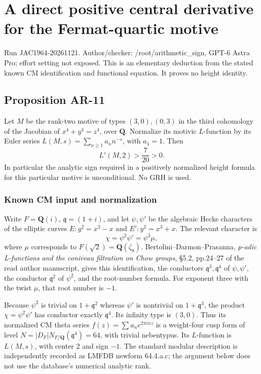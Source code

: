 \section{A direct positive central derivative for the Fermat-quartic
motive}\label{a-direct-positive-central-derivative-for-the-fermat-quartic-motive}

Run JAC1964-20261121. Author/checker: /root/arithmetic\_sign, GPT-6
Astra Pro; effort setting not exposed. This is an elementary deduction
from the stated known CM identification and functional equation. It
proves no height identity.

\subsection{Proposition AR-11}\label{proposition-ar-11}

Let \(M\) be the rank-two motive of types \((3,0),(0,3)\) in the third
cohomology of the Jacobian of \(x^4+y^4=z^4\), over \(\mathbf Q\).
Normalize its motivic \(L\)-function by its Euler series
\(L(M,s)=\sum_{n\ge1}a_n n^{-s}\), with \(a_1=1\). Then \[
L'(M,2)>\frac7{20}>0.
\tag{AR.14}
\] In particular the analytic sign required in a positively normalized
height formula for this particular motive is unconditional. No GRH is
used.

\subsubsection{Known CM input and
normalization}\label{known-cm-input-and-normalization}

Write \(F=\mathbf Q(i)\), \(\mathfrak q=(1+i)\), and let \(\psi,\psi'\)
be the algebraic Hecke characters of the elliptic curves \(E:y^2=x^3-x\)
and \(E':y^2=x^3+x\). The relevant character is \[
\chi=\psi^2\psi'=\psi^3\mu,
\] where \(\mu\) corresponds to \(F(\sqrt2)=\mathbf Q(\zeta_8)\).
Bertolini--Darmon--Prasanna, \emph{p-adic L-functions and the coniveau
filtration on Chow groups}, §5.2, pp.24--27 of the read author
manuscript, gives this identification, the conductors
\(\mathfrak q^3,\mathfrak q^4\) of \(\psi,\psi'\), the conductor
\(\mathfrak q^2\) of \(\psi^2\), and the root-number formula. For
exponent three with the twist \(\mu\), that root number is \(-1\).

Because \(\psi^2\) is trivial on \(1+\mathfrak q^2\) whereas \(\psi'\)
is nontrivial on \(1+\mathfrak q^3\), the product \(\chi=\psi^2\psi'\)
has conductor exactly \(\mathfrak q^4\). Its infinity type is \((3,0)\).
Thus its normalized CM theta series \(f(z)=\sum a_n e^{2\pi i nz}\) is a
weight-four cusp form of level
\(N=|D_F|N_{F/\mathbf Q}(\mathfrak q^4)=64\), with trivial nebentypus.
Its \(L\)-function is \(L(M,s)\), with center \(2\) and sign \(-1\). The
standard modular description is independently recorded as LMFDB newform
64.4.a.c; the argument below does not use the database's numerical
analytic rank.

